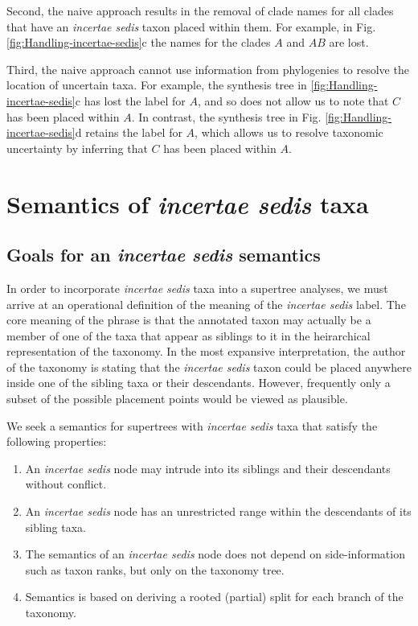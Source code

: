 \documentclass[english]{article}
\begin{document}
Second, the naive approach results in the removal of clade names for all clades that
have an \emph{incertae sedis} taxon placed within them.  For example, in Fig.
\ref{fig:Handling-incertae-sedis}c the names for the clades $A$ and $AB$ are lost.

Third, the naive approach cannot use information from phylogenies to resolve the
location of uncertain taxa.  For example, the synthesis tree in
\ref{fig:Handling-incertae-sedis}c has lost the label for $A$, and so does not
allow us to note that $C$ has been placed within $A$.  In contrast, the synthesis
tree in Fig. \ref{fig:Handling-incertae-sedis}d retains the label for $A$, which
allows us to resolve taxonomic uncertainty by inferring that $C$ has been placed
within $A$.

\section{\label{sec:Semantics-of-incertae}Semantics of \emph{incertae
sedis} taxa}

\subsection{Goals for an \emph{incertae sedis} semantics}

In order to incorporate \emph{incertae sedis }taxa into a supertree
analyses, we must arrive at an operational definition of the meaning
of the \emph{incertae sedis} label.
The core meaning of the phrase is
that the annotated taxon may actually be a member of one of the taxa
that appear as siblings to it in the heirarchical representation of
the taxonomy.
In the most expansive interpretation, the author of the
taxonomy is stating that the \emph{incertae sedis} taxon could be
placed anywhere inside one of the sibling taxa or their descendants.
However, frequently only a subset of the possible placement points
would be viewed as plausible.

We seek a semantics for supertrees with \emph{incertae sedis }taxa
that satisfy the following properties:
\begin{enumerate}
    \item An \emph{incertae sedis} node may intrude into its siblings and their descendants without conflict.
    \item An \emph{incertae sedis} node has an unrestricted range within the descendants of its sibling taxa.
    \item The semantics of an \emph{incertae sedis} node does not depend on side-information such as taxon ranks, but only on the taxonomy tree.
    \item Semantics is based on deriving a rooted (partial) split for each branch of the taxonomy.
\end{enumerate}
\end{document}
